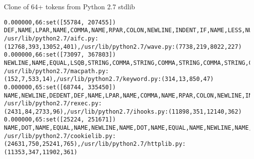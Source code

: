 \begin{frame}[shrink=35,fragile]{Clone of 64+ tokens from Python 2.7 stdlib}

\lstset{
    breaklines=true
}

\begin{lstlisting}
0.000000,66:set([55784, 207455])	DEF,NAME,LPAR,NAME,COMMA,NAME,RPAR,COLON,NEWLINE,INDENT,IF,NAME,LESS,NUMBER,OR,NAME,GREATER,NAME,DOT,NAME,COLON,NEWLINE,INDENT,RAISE,NAME,COMMA,STRING,NEWLINE,DEDENT,NAME,DOT,NAME,EQUAL,NAME,NEWLINE,NAME,DOT,NAME,EQUAL,NUMBER,NEWLINE,DEDENT,DEF,NAME,LPAR,NAME,COMMA,NAME,RPAR,COLON,NEWLINE,INDENT,IF,NAME,DOT,NAME,COLON,NEWLINE,INDENT,NAME,DOT,NAME,DOT,NAME,LPAR,NUMBER	/usr/lib/python2.7/aifc.py:(12768,393,13052,401),/usr/lib/python2.7/wave.py:(7738,219,8022,227)
0.000000,66:set([73097, 367803])	NEWLINE,NAME,EQUAL,LSQB,STRING,COMMA,STRING,COMMA,STRING,COMMA,STRING,COMMA,STRING,COMMA,STRING,COMMA,STRING,COMMA,STRING,COMMA,STRING,COMMA,STRING,COMMA,STRING,COMMA,STRING,COMMA,STRING,COMMA,STRING,COMMA,STRING,COMMA,STRING,COMMA,STRING,COMMA,STRING,COMMA,STRING,COMMA,STRING,COMMA,STRING,COMMA,STRING,COMMA,STRING,COMMA,STRING,COMMA,STRING,COMMA,STRING,COMMA,STRING,COMMA,STRING,COMMA,STRING,COMMA,STRING,COMMA,STRING,COMMA	/usr/lib/python2.7/macpath.py:(152,7,533,14),/usr/lib/python2.7/keyword.py:(314,13,850,47)
0.000000,65:set([68744, 335450])	NAME,NEWLINE,DEDENT,DEF,NAME,LPAR,NAME,COMMA,NAME,RPAR,COLON,NEWLINE,INDENT,NAME,DOT,NAME,EQUAL,NAME,NEWLINE,DEDENT,DEF,NAME,LPAR,NAME,RPAR,COLON,NEWLINE,INDENT,RETURN,NAME,DOT,NAME,DOT,NAME,LPAR,RPAR,NEWLINE,DEDENT,DEF,NAME,LPAR,NAME,COMMA,NAME,RPAR,COLON,NEWLINE,INDENT,RETURN,NAME,DOT,NAME,DOT,NAME,LPAR,NAME,RPAR,NEWLINE,DEDENT,DEF,NAME,LPAR,NAME,COMMA,NAME	/usr/lib/python2.7/rexec.py:(2431,84,2733,96),/usr/lib/python2.7/ihooks.py:(11898,351,12140,362)
0.000000,65:set([25224, 251671])	NAME,DOT,NAME,EQUAL,NAME,NEWLINE,NAME,DOT,NAME,EQUAL,NAME,NEWLINE,NAME,DOT,NAME,EQUAL,NAME,NEWLINE,NAME,DOT,NAME,EQUAL,NAME,NEWLINE,NAME,DOT,NAME,EQUAL,NAME,NEWLINE,NAME,DOT,NAME,EQUAL,NAME,NEWLINE,NAME,DOT,NAME,EQUAL,NAME,NEWLINE,NAME,DOT,NAME,EQUAL,NAME,NEWLINE,NAME,DOT,NAME,EQUAL,NAME,NEWLINE,NAME,DOT,NAME,EQUAL,NAME,NEWLINE,NAME,DOT,NAME,EQUAL,NAME	/usr/lib/python2.7/cookielib.py:(24631,750,25241,765),/usr/lib/python2.7/httplib.py:(11353,347,11902,361)
\end{lstlisting}

\end{frame}

